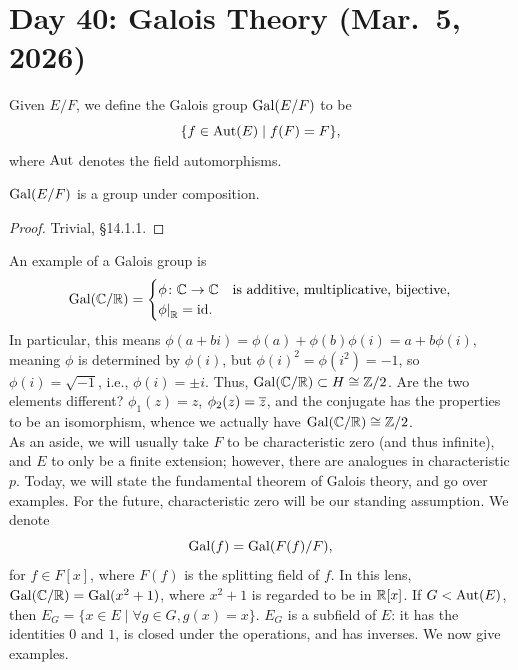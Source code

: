 \section{Day 40: Galois Theory (Mar.\ 5, 2026)}
Given $E/F$, we define the Galois group $\operatorname{Gal}(E/F)$ to be
\[ \{f \in \operatorname{Aut}(E) \mid f(F) = F\}, \]
where $\operatorname{Aut}$ denotes the field automorphisms.
\begin{claim}
    $\operatorname{Gal}(E/F)$ is a group under composition.
\end{claim}
\begin{proof}
    Trivial, \S14.1.1.
\end{proof}
An example of a Galois group is
\[ \Gal(\CC/\RR) = \begin{cases} \phi \colon \CC \to \CC & \text{is additive, multiplicative, bijective}, \\ \restr{\phi}{\RR} = \id. \end{cases} \]
In particular, this means $\phi(a + bi) = \phi(a) + \phi(b) \phi(i) = a + b\phi(i)$, meaning $\phi$ is determined by $\phi(i)$, but $\phi(i)^2 = \phi(i^2) = -1$, so $\phi(i) = \sqrt{-1}$, i.e., $\phi(i) = \pm i$. Thus, $\operatorname{Gal}(\mathbb C/\mathbb R) \subset H \cong \mathbb Z/2$. Are the two elements different? $\phi_1(z) = z$, $\phi_2(z) = \overline z$, and the conjugate has the properties to be an isomorphism, whence we actually have $\operatorname{Gal}(\mathbb C/\mathbb R) \cong \mathbb Z/2$.
\\[8pt]
As an aside, we will usually take $F$ to be characteristic zero (and thus infinite), and $E$ to only be a finite extension; however, there are analogues in characteristic $p$. Today, we will state the fundamental theorem of Galois theory, and go over examples. For the future, characteristic zero will be our standing assumption. We denote
\[ \operatorname{Gal}(f) = \operatorname{Gal}(F(f) / F), \]
for $f \in F[x]$, where $F(f)$ is the splitting field of $f$. In this lens, $\operatorname{Gal}(\mathbb C/\mathbb R) = \operatorname{Gal}(x^2 + 1)$, where $x^2 + 1$ is regarded to be in $\mathbb R[x]$. If $G < \operatorname{Aut}(E)$, then $E_G = \{x \in E \mid \forall g \in G, g(x) = x\}$. $E_G$ is a subfield of $E$: it has the identities $0$ and $1$, is closed under the operations, and has inverses. We now give examples.
